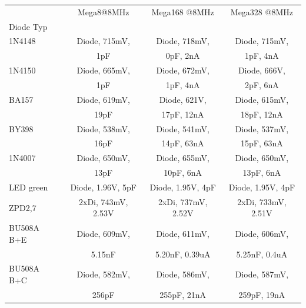 \begin{table}[H]
  \begin{center}
    \begin{tabular}{| l | c | c | c |}
    \hline
           & Mega8@8MHz          & Mega168 @8MHz       & Mega328 @8MHz     \\
 Diode Typ &                     &                     &                   \\
    \hline
    \hline
1N4148     & Diode, 715mV,        & Diode, 718mV,            & Diode, 715mV,           \\
           &               1pF    &               0pF, 2nA   &               1pF, 4nA  \\
    \hline
1N4150     & Diode, 665mV,        & Diode, 672mV,            & Diode, 666V,           \\
           &               1pF    &               1pF, 4nA   &              2pF, 6nA  \\
    \hline
BA157      & Diode, 619mV,        & Diode, 621V,              & Diode, 615mV,            \\
           &               19pF   &              17pF, 12nA   &               18pF, 12nA \\
    \hline
BY398      & Diode, 538mV,        & Diode, 541mV,             & Diode, 537mV,            \\
           &               16pF   &               14pF, 63nA  &               15pF, 63nA \\
    \hline
1N4007     & Diode, 650mV,        & Diode, 655mV,            & Diode, 650mV,           \\
           &               13pF   &               10pF, 6nA  &               13pF, 6nA \\
    \hline
LED green  & Diode, 1.96V, 5pF    & Diode, 1.95V, 4pF   & Diode, 1.95V, 4pF \\
    \hline
ZPD2,7     & 2xDi, 743mV, 2.53V   & 2xDi, 737mV, 2.52V  & 2xDi, 733mV, 2.51V \\
    \hline
BU508A B+E & Diode, 609mV,        & Diode, 611mV,                & Diode, 606mV,              \\
           &               5.15nF &               5.20nF, 0.39uA &               5.25nF, 0.4uA\\
    \hline
BU508A B+C & Diode, 582mV,        & Diode, 586mV,             & Diode, 587mV,            \\
           &               256pF  &               255pF, 21nA &               259pF, 19nA\\

\end{tabular}
\end{center}
\end{table}
